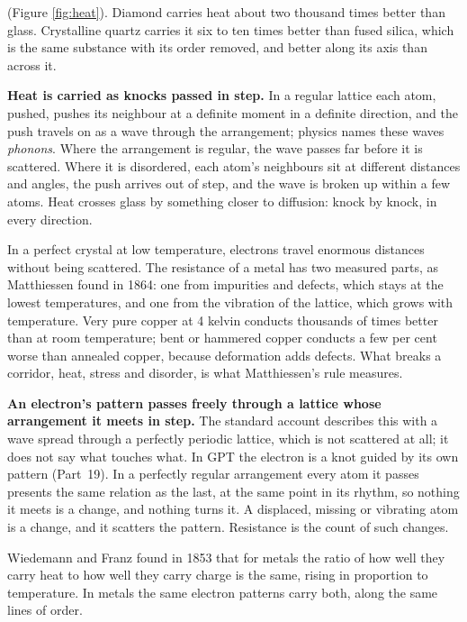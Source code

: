 \documentclass[11pt,a4paper]{article}
\begin{document}
 (Figure \ref{fig:heat}). Diamond carries heat about two thousand times better than glass. Crystalline quartz carries it six to ten times better than fused silica, which is the same substance with its order removed, and better along its axis than across it.

\begin{hypbar}
\textbf{Heat is carried as knocks passed in step.} In a regular lattice each atom, pushed, pushes its neighbour at a definite moment in a definite direction, and the push travels on as a wave through the arrangement; physics names these waves \emph{phonons}. Where the arrangement is regular, the wave passes far before it is scattered. Where it is disordered, each atom's neighbours sit at different distances and angles, the push arrives out of step, and the wave is broken up within a few atoms. Heat crosses glass by something closer to diffusion: knock by knock, in every direction.
\end{hypbar}

 In a perfect crystal at low temperature, electrons travel enormous distances without being scattered. The resistance of a metal has two measured parts, as Matthiessen found in 1864: one from impurities and defects, which stays at the lowest temperatures, and one from the vibration of the lattice, which grows with temperature. Very pure copper at 4 kelvin conducts thousands of times better than at room temperature; bent or hammered copper conducts a few per cent worse than annealed copper, because deformation adds defects. What breaks a corridor, heat, stress and disorder, is what Matthiessen's rule measures.

\begin{hypbar}
\textbf{An electron's pattern passes freely through a lattice whose arrangement it meets in step.} The standard account describes this with a wave spread through a perfectly periodic lattice, which is not scattered at all; it does not say what touches what. In GPT the electron is a knot guided by its own pattern (Part~19). In a perfectly regular arrangement every atom it passes presents the same relation as the last, at the same point in its rhythm, so nothing it meets is a change, and nothing turns it. A displaced, missing or vibrating atom is a change, and it scatters the pattern. Resistance is the count of such changes.
\end{hypbar}

 Wiedemann and Franz found in 1853 that for metals the ratio of how well they carry heat to how well they carry charge is the same, rising in proportion to temperature. In metals the same electron patterns carry both, along the same lines of order.
\end{document}
